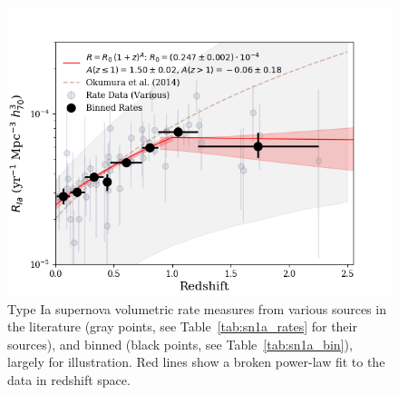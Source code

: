 \documentclass[apj]{aastex62}
\begin{document}
\begin{figure}[t]
   \centering
   \includegraphics[width=6.1in]{figure_SNIa_rate_z_pwr_fit}
   \caption{\footnotesize Type Ia supernova volumetric rate measures from various sources in the literature (gray points, see Table~\ref{tab:sn1a_rates} for their sources), and binned (black points, see Table~\ref{tab:sn1a_bin}), largely for illustration. Red lines show a broken power-law fit to the data in redshift space.}
   \label{fig:sn1a_rates}
\end{figure}
\end{document}
